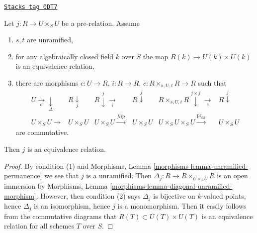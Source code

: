 \begin{lemma}
\label{groupoids-lemma-etale-equivalence-relation}
\href{https://stacks.math.columbia.edu/tag/0DT7}{\texttt{Stacks tag 0DT7}}

Let $j : R \to U \times_S U$ be a pre-relation. Assume
\begin{enumerate}
\item $s, t$ are unramified,
\item for any algebraically closed field $k$ over $S$
the map $R(k) \to U(k) \times U(k)$ is an equivalence relation,
\item there are morphisms $e : U \to R$, $i : R \to R$,
$c : R \times_{s, U, t} R \to R$ such that
$$
\begin{array}{cccccc}U \underset{e}{\longrightarrow}\underset{\Delta}{\downarrow} & R \underset{j}{\downarrow} & R \overset{j}{\downarrow}\underset{i}{\longrightarrow} & R \overset{j}{\downarrow} & R \times_{s, U, t} R \overset{j \times j}{\downarrow}\underset{c}{\longrightarrow} & R \overset{j}{\downarrow} \\ U \times_S U \longrightarrow & U \times_S U & U \times_S U \overset{flip}{\longrightarrow} & U \times_S U & U \times_S U \times_S U \overset{\text{pr}_{02}}{\longrightarrow} & U \times_S U\end{array}
$$
are commutative.
\end{enumerate}
Then $j$ is an equivalence relation.
\end{lemma}

\begin{proof}
By condition (1) and
Morphisms, Lemma \ref{morphisms-lemma-unramified-permanence}
we see that $j$ is a unramified. Then
$\Delta_j : R \to R \times_{U \times_S U} R$ is an open immersion by
Morphisms, Lemma \ref{morphisms-lemma-diagonal-unramified-morphism}.
However, then condition (2) says $\Delta_j$ is bijective on
$k$-valued points, hence $\Delta_j$ is an isomorphism, hence $j$
is a monomorphism. Then it easily follows from the commutative
diagrams that $R(T) \subset U(T) \times U(T)$ is an equivalence
relation for all schemes $T$ over $S$.
\end{proof}

